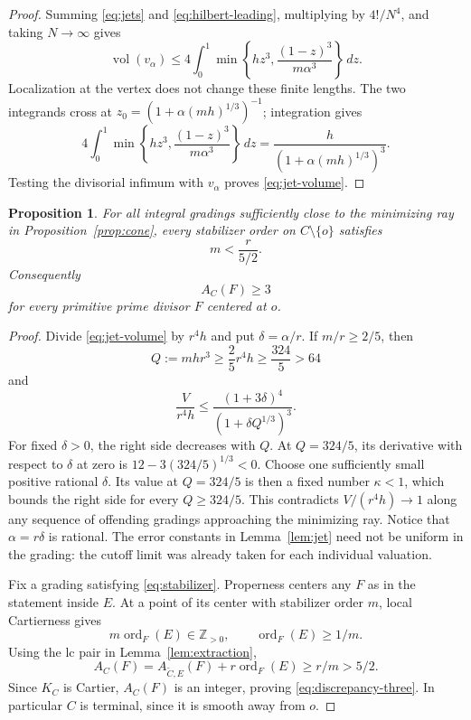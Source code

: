 \documentclass[11pt]{article}
\newtheorem{proposition}[theorem]{Proposition}
\theoremstyle{definition}
\theoremstyle{remark}
\numberwithin{equation}{section}
\newcommand{\Z}{\mathbb Z}
\newcommand{\ord}{\operatorname{ord}}
\newcommand{\vol}{\operatorname{vol}}
\newcommand{\dd}{\,d}
\begin{document}
\begin{proof}
Summing \eqref{eq:jets} and \eqref{eq:hilbert-leading}, multiplying by \(4!/N^4\), and taking \(N\to\infty\) gives
\[
\vol(v_\alpha)\le
4\int_0^1\min\!\left\{hz^3,\frac{(1-z)^3}{m\alpha^3}\right\}\dd z.
\]
Localization at the vertex does not change these finite lengths. The two integrands cross at \(z_0=(1+\alpha(mh)^{1/3})^{-1}\); integration gives
\[
4\int_0^1\min\!\left\{hz^3,\frac{(1-z)^3}{m\alpha^3}\right\}\dd z
=\frac h{(1+\alpha(mh)^{1/3})^3}.
\]
Testing the divisorial infimum with \(v_\alpha\) proves \eqref{eq:jet-volume}.
\end{proof}

\begin{proposition}\label{prop:stabilizer}
For all integral gradings sufficiently close to the minimizing ray in Proposition~\ref{prop:cone}, every stabilizer order on \(C\setminus\{o\}\) satisfies
\begin{equation}\label{eq:stabilizer}
m<\frac r{5/2}.
\end{equation}
Consequently
\begin{equation}\label{eq:discrepancy-three}
A_C(F)\ge3
\end{equation}
for every primitive prime divisor \(F\) centered at \(o\).
\end{proposition}

\begin{proof}
Divide \eqref{eq:jet-volume} by \(r^4h\) and put \(\delta=\alpha/r\). If \(m/r\ge2/5\), then
\[
Q:=mhr^3\ge\frac25r^4h\ge\frac{324}{5}>64
\]
and
\[
\frac V{r^4h}\le
\frac{(1+3\delta)^4}{(1+\delta Q^{1/3})^3}.
\]
For fixed \(\delta>0\), the right side decreases with \(Q\). At \(Q=324/5\), its derivative with respect to \(\delta\) at zero is \(12-3(324/5)^{1/3}<0\). Choose one sufficiently small positive rational \(\delta\). Its value at \(Q=324/5\) is then a fixed number \(\kappa<1\), which bounds the right side for every \(Q\ge324/5\).
This contradicts \(V/(r^4h)\to1\) along any sequence of offending gradings approaching the minimizing ray. Notice that \(\alpha=r\delta\) is rational. The error constants in Lemma~\ref{lem:jet} need not be uniform in the grading: the cutoff limit was already taken for each individual valuation.

Fix a grading satisfying \eqref{eq:stabilizer}. Properness centers any \(F\) as in the statement inside \(E\). At a point of its center with stabilizer order \(m\), local Cartierness gives
\[
m\ord_F(E)\in\Z_{>0},\qquad\ord_F(E)\ge1/m.
\]
Using the lc pair in Lemma~\ref{lem:extraction},
\[
A_C(F)=A_{\widetilde C,E}(F)+r\ord_F(E)\ge r/m>5/2.
\]
Since \(K_C\) is Cartier, \(A_C(F)\) is an integer, proving \eqref{eq:discrepancy-three}. In particular \(C\) is terminal, since it is smooth away from \(o\).
\end{proof}
\end{document}
